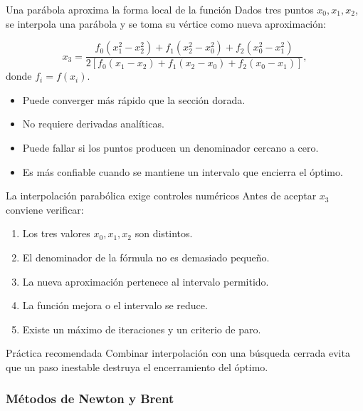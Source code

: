 \documentclass[../../main.tex]{subfiles}
\begin{document}
\begin{frame}{Una parábola aproxima la forma local de la función}
Dados tres puntos $x_0,x_1,x_2$, se interpola una parábola y se toma su vértice como nueva aproximación:

\small
\[
x_3=
\frac{
f_0(x_1^2-x_2^2)+
f_1(x_2^2-x_0^2)+
f_2(x_0^2-x_1^2)
}{
2\left[
f_0(x_1-x_2)+
f_1(x_2-x_0)+
f_2(x_0-x_1)
\right]
},
\]
donde $f_i=f(x_i)$.

\begin{itemize}
  \item Puede converger más rápido que la sección dorada.
  \item No requiere derivadas analíticas.
  \item Puede fallar si los puntos producen un denominador cercano a cero.
  \item Es más confiable cuando se mantiene un intervalo que encierra el óptimo.
\end{itemize}
\end{frame}

\begin{frame}{La interpolación parabólica exige controles numéricos}
Antes de aceptar $x_3$ conviene verificar:
\begin{enumerate}
  \item Los tres valores $x_0,x_1,x_2$ son distintos.
  \item El denominador de la fórmula no es demasiado pequeño.
  \item La nueva aproximación pertenece al intervalo permitido.
  \item La función mejora o el intervalo se reduce.
  \item Existe un máximo de iteraciones y un criterio de paro.
\end{enumerate}

\begin{alertblock}{Práctica recomendada}
Combinar interpolación con una búsqueda cerrada evita que un paso inestable destruya el encerramiento del óptimo.
\end{alertblock}
\end{frame}

\subsubsection{Métodos de Newton y Brent}
\end{document}
